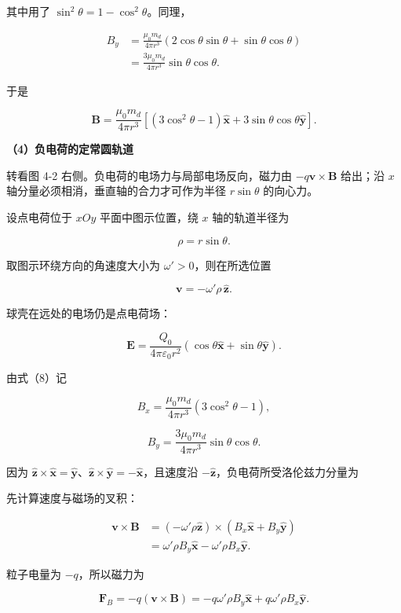 \documentclass[12pt,a4paper,UTF8]{ctexart}
\begin{document}
其中用了 \(\sin^2\theta=1-\cos^2\theta\)。同理，

\[\begin{aligned}
B_y
&=\frac{\mu_0m_d}{4\pi r^3}
\left(2\cos\theta\sin\theta
+\sin\theta\cos\theta\right)\\
&=\frac{3\mu_0m_d}{4\pi r^3}
\sin\theta\cos\theta.
\end{aligned}\]

于是

\[\boxed{
\boldsymbol B=\frac{\mu_0m_d}{4\pi r^3}
\left[(3\cos^2\theta-1)\hat{\boldsymbol x}
+3\sin\theta\cos\theta\hat{\boldsymbol y}\right]
}. \tag{8}\]

\textbf{（4）负电荷的定常圆轨道}

转看图 4-2 右侧。负电荷的电场力与局部电场反向，磁力由
\(-q\bm v\times\bm B\) 给出；沿 \(x\)
轴分量必须相消，垂直轴的合力才可作为半径 \(r\sin\theta\) 的向心力。

设点电荷位于 \(xOy\) 平面中图示位置，绕 \(x\) 轴的轨道半径为

\[\rho=r\sin\theta.\]

取图示环绕方向的角速度大小为 \(\omega'>0\)，则在所选位置

\[\boldsymbol v=-\omega'\rho\,\hat{\boldsymbol z}.\]

球壳在远处的电场仍是点电荷场：

\[\boldsymbol E=\frac{Q_0}{4\pi\varepsilon_0r^2}
(\cos\theta\hat{\boldsymbol x}+\sin\theta\hat{\boldsymbol y}). \tag{9}\]

由式（8）记

\[B_x=\frac{\mu_0m_d}{4\pi r^3}(3\cos^2\theta-1),\]

\[B_y=\frac{3\mu_0m_d}{4\pi r^3}\sin\theta\cos\theta. \tag{10}\]

因为
\(\hat{\boldsymbol z}\times\hat{\boldsymbol x}=\hat{\boldsymbol y}\)、\(\hat{\boldsymbol z}\times\hat{\boldsymbol y}=-\hat{\boldsymbol x}\)，且速度沿
\(-\hat{\boldsymbol z}\)，负电荷所受洛伦兹力分量为

先计算速度与磁场的叉积：

\[\begin{aligned}
\boldsymbol v\times\boldsymbol B
&=(-\omega'\rho\hat{\boldsymbol z})
\times(B_x\hat{\boldsymbol x}+B_y\hat{\boldsymbol y})\\
&=\omega'\rho B_y\hat{\boldsymbol x}
-\omega'\rho B_x\hat{\boldsymbol y}.
\end{aligned}\]

粒子电量为 \(-q\)，所以磁力为

\[\boldsymbol F_B=-q(\boldsymbol v\times\boldsymbol B)
=-q\omega'\rho B_y\hat{\boldsymbol x}
+q\omega'\rho B_x\hat{\boldsymbol y}.\]
\end{document}
